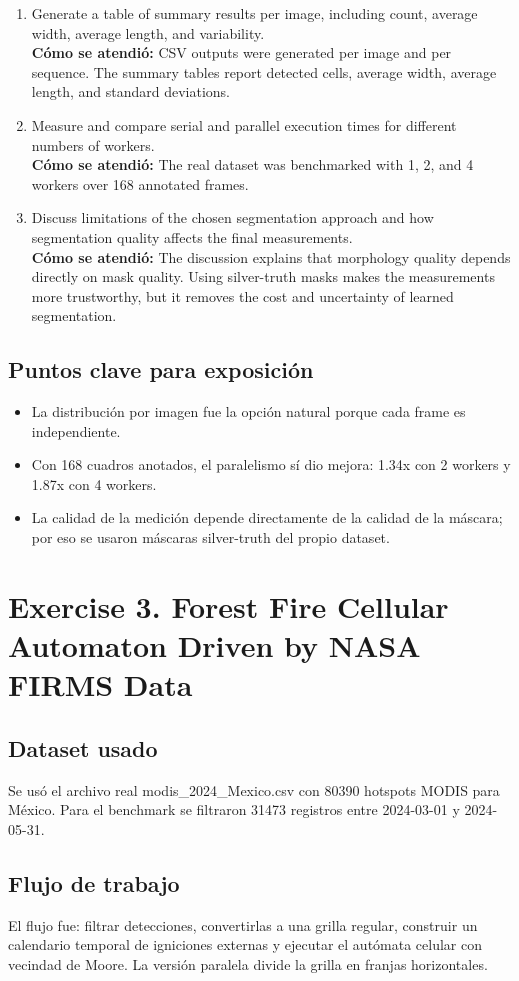 \documentclass[11pt]{article}
\begin{document}
\begin{enumerate}[leftmargin=*]
\item Generate a table of summary results per image, including count, average width, average length, and variability.\\
\textbf{Cómo se atendió:} CSV outputs were generated per image and per sequence. The summary tables report detected cells, average width, average length, and standard deviations.
\item Measure and compare serial and parallel execution times for different numbers of workers.\\
\textbf{Cómo se atendió:} The real dataset was benchmarked with 1, 2, and 4 workers over 168 annotated frames.
\item Discuss limitations of the chosen segmentation approach and how segmentation quality affects the final measurements.\\
\textbf{Cómo se atendió:} The discussion explains that morphology quality depends directly on mask quality. Using silver-truth masks makes the measurements more trustworthy, but it removes the cost and uncertainty of learned segmentation.
\end{enumerate}
\subsection*{Puntos clave para exposición}
\begin{itemize}[leftmargin=*]
\item La distribución por imagen fue la opción natural porque cada frame es independiente.
\item Con 168 cuadros anotados, el paralelismo sí dio mejora: 1.34x con 2 workers y 1.87x con 4 workers.
\item La calidad de la medición depende directamente de la calidad de la máscara; por eso se usaron máscaras silver-truth del propio dataset.
\end{itemize}
\section*{Exercise 3. Forest Fire Cellular Automaton Driven by NASA FIRMS Data}
\subsection*{Dataset usado}
Se usó el archivo real modis\_2024\_Mexico.csv con 80390 hotspots MODIS para México. Para el benchmark se filtraron 31473 registros entre 2024-03-01 y 2024-05-31.
\subsection*{Flujo de trabajo}
El flujo fue: filtrar detecciones, convertirlas a una grilla regular, construir un calendario temporal de igniciones externas y ejecutar el autómata celular con vecindad de Moore. La versión paralela divide la grilla en franjas horizontales.
\end{document}
